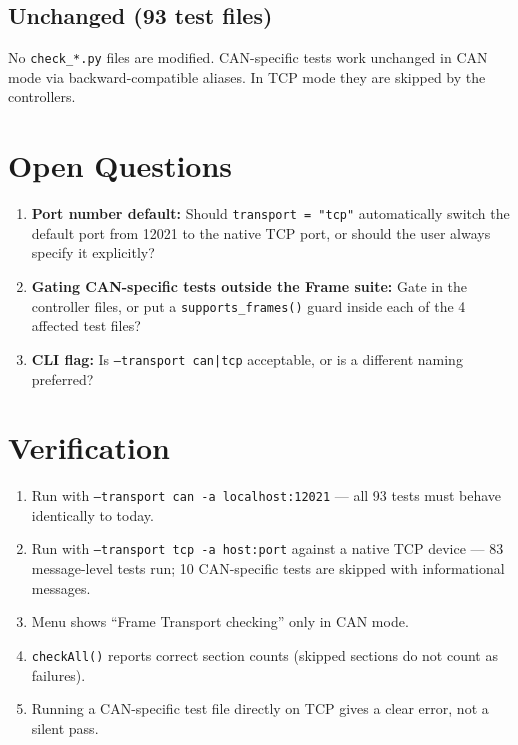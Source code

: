 \subsection{Unchanged (93 test files)}

No \texttt{check\_*.py} files are modified.  CAN-specific tests work
unchanged in CAN mode via backward-compatible aliases.  In TCP mode they are
skipped by the controllers.

\section{Open Questions}

\begin{enumerate}
\item \textbf{Port number default:} Should \texttt{transport = "tcp"}
    automatically switch the default port from 12021 to the native TCP port,
    or should the user always specify it explicitly?
\item \textbf{Gating CAN-specific tests outside the Frame suite:}
    Gate in the controller files, or put a \texttt{supports\_frames()} guard
    inside each of the 4 affected test files?
\item \textbf{CLI flag:} Is \texttt{--transport can|tcp} acceptable, or
    is a different naming preferred?
\end{enumerate}

\section{Verification}

\begin{enumerate}
\item Run with \texttt{--transport can -a localhost:12021} --- all 93 tests
    must behave identically to today.
\item Run with \texttt{--transport tcp -a host:port} against a native TCP
    device --- 83 message-level tests run; 10 CAN-specific tests are skipped
    with informational messages.
\item Menu shows ``Frame Transport checking'' only in CAN mode.
\item \texttt{checkAll()} reports correct section counts (skipped sections
    do not count as failures).
\item Running a CAN-specific test file directly on TCP gives a clear
    error, not a silent pass.
\end{enumerate}


